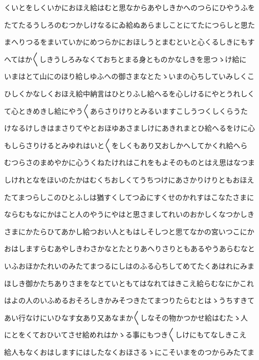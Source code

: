 \documentclass[a4paper,11pt,landscape]{ltjtarticle}
\begin{document}
\par\medskip
くいとをしくいかにおほえ給はむと思なからあやしきかへのつらにひやうふを
\par\medskip
たてたるうしろのむつかしけなるにゐ給ぬあらましことにてたにつらしと思た
\par\medskip
まへりつるをまいていかにめつらかにおほしうとまむといと心くるしきにもす
\par\medskip
へてはか〱しきうしろみなくておちとまる身とものかなしきを思つゝけ給に
\par\medskip
いまはとて山にのほり給しゆふへの御さまなとたゝいまの心ちしていみしくこ
\par\medskip
ひしくかなしくおほえ給中納言はひとりふし給へるを心しけるにやとうれしく
\par\medskip
て心ときめきし給にやう〱あらさりけりとみるいますこしうつくしくらうた
\par\medskip
けなるけしきはまさりてやとおほゆあさましけにあきれまとひ給へるをけに心
\par\medskip
もしらさりけるとみゆれはいと〱をしくもあり又おしかへしてかくれ給へら
\par\medskip
むつらさのまめやかに心うくねたけれはこれをもよそのものとはえ思はなつま
\par\medskip
しけれとなをほいのたかはむくちおしくてうちつけにあさかりけりともおほえ
\par\medskip
たてまつらしこのひとふしは猶すくしてつゐにすくせのかれすはこなたさまに
\par\medskip
ならむもなにかはこと人のやうにやはと思さましてれいのおかしくなつかしき
\par\medskip
さまにかたらひてあかし給つおい人ともはしそしつと思てなかの宮いつこにか
\par\medskip
おはしますらむあやしきわさかなとたとりあへりさりともあるやうあらむなと
\par\medskip
いふおほかたれいのみたてまつるにしはのふる心ちしてめてたくあはれにみま
\par\medskip
ほしき御かたちありさまをなとていともてはなれてはきこえ給らむなにかこれ
\par\medskip
はよの人のいふめるおそろしきかみそつきたてまつりたらむとはゝうちすきて
\par\medskip
あい行なけにいひなす女あり又あなまか〱しなその物かつかせ給はむたゝ人
\par\medskip
にとをくておひいてさせ給めれはかゝる事にもつき〱しけにもてなしきこえ
\par\medskip
給人もなくおはしますにはしたなくおほさるゝにこそいまをのつからみたてま
\par\medskip
\end{document}
